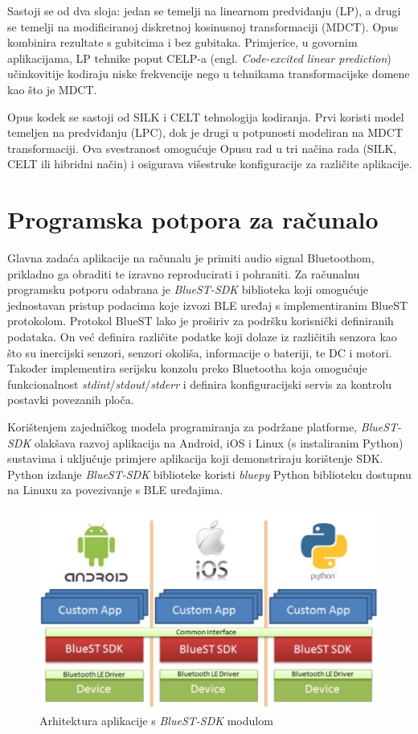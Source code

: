 Sastoji se od dva sloja: jedan se temelji na linearnom predviđanju (LP), a drugi se temelji na modificiranoj diskretnoj kosinusnoj transformaciji (MDCT). Opus kombinira rezultate s gubitcima i bez gubitaka. Primjerice, u govornim aplikacijama, LP tehnike poput CELP-a (engl. \textit{Code-excited linear prediction}) učinkovitije kodiraju niske frekvencije nego u tehnikama transformacijske domene kao što je MDCT.

Opus kodek se sastoji od SILK i CELT tehnologija kodiranja. Prvi koristi model temeljen na predviđanju (LPC), dok je drugi u potpunosti modeliran na MDCT transformaciji. Ova svestranost omogućuje Opusu rad u tri načina rada (SILK, CELT ili hibridni način) i osigurava višestruke konfiguracije za različite aplikacije.

\section{Programska potpora za računalo}

Glavna zadaća aplikacije na računalu je primiti audio signal Bluetoothom, prikladno ga obraditi te izravno reproducirati i pohraniti. Za računalnu programsku potporu odabrana je \textit{BlueST-SDK} biblioteka koji omogućuje jednostavan pristup podacima koje izvozi BLE uređaj s implementiranim BlueST protokolom. Protokol BlueST lako je proširiv za podršku korisnički definiranih podataka. On već definira različite podatke koji dolaze iz različitih senzora kao što su inercijski senzori, senzori okoliša, informacije o bateriji, te DC i motori. Također implementira serijsku konzolu preko Bluetootha koja omogućuje funkcionalnost \textit{stdint}/\textit{stdout}/\textit{stderr} i definira konfiguracijski servis za kontrolu postavki povezanih ploča. 

Korištenjem zajedničkog modela programiranja za podržane platforme, \textit{BlueST-SDK} olakšava razvoj aplikacija na Android, iOS i Linux (s instaliranim Python) sustavima i uključuje primjere aplikacija koji demonstriraju korištenje SDK. Python izdanje \textit{BlueST-SDK} biblioteke koristi \textit{bluepy} Python biblioteku dostupnu na Linuxu za povezivanje s BLE uređajima.

\begin{figure}[ht]
	\includegraphics[width=\linewidth]{imgs/bluest_stack}
	\caption{Arhitektura aplikacije s \textit{BlueST-SDK} modulom}
	\label{fig:bluest_stack}
\end{figure}


